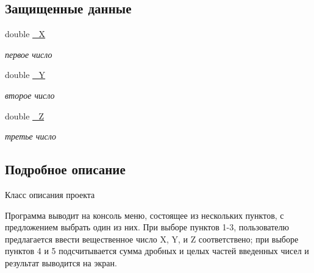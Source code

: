 \subsection*{Защищенные данные}
\begin{DoxyCompactItemize}
\item 
\hypertarget{class_parygina___class___project_a2d617dd0807f48fe47809f5abb638681}{double \hyperlink{class_parygina___class___project_a2d617dd0807f48fe47809f5abb638681}{\+\_\+\+X}}\label{class_parygina___class___project_a2d617dd0807f48fe47809f5abb638681}

\begin{DoxyCompactList}\small\item\em первое число \end{DoxyCompactList}\item 
\hypertarget{class_parygina___class___project_af4fbf182e3560e91311a57074ede96aa}{double \hyperlink{class_parygina___class___project_af4fbf182e3560e91311a57074ede96aa}{\+\_\+\+Y}}\label{class_parygina___class___project_af4fbf182e3560e91311a57074ede96aa}

\begin{DoxyCompactList}\small\item\em второе число \end{DoxyCompactList}\item 
\hypertarget{class_parygina___class___project_a733fb7da993cf99c39a6d1f22a9268f5}{double \hyperlink{class_parygina___class___project_a733fb7da993cf99c39a6d1f22a9268f5}{\+\_\+\+Z}}\label{class_parygina___class___project_a733fb7da993cf99c39a6d1f22a9268f5}

\begin{DoxyCompactList}\small\item\em третье число \end{DoxyCompactList}\end{DoxyCompactItemize}


\subsection{Подробное описание}
Класс описания проекта 

Программа выводит на консоль меню, состоящее из нескольких пунктов, с предложением выбрать один из них. При выборе пунктов 1-\/3, пользователю предлагается ввести вещественное число X, Y, и Z соответствено; при выборе пунктов 4 и 5 подсчитывается сумма дробных и целых частей введенных чисел и результат выводится на экран. 

